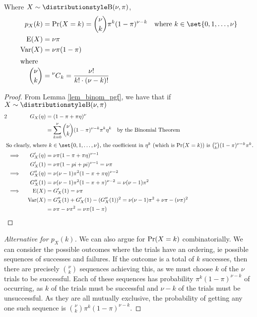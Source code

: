 \begin{theorem}
 Where \(X \sim \Binomial(\nu, \pi)\),
 \begin{align*}
  p_X(k) &= \Prob(X = k) = \binom \nu k \pi^k (1 - \pi)^{\nu - k}
      \quad \text{where \(k \in \set{0, 1, \dotsc, \nu}\)} \\
  \Expect(X) &= \nu \pi \\
  \Var(X) &= \nu \pi (1 - \pi) \\
  \intertext{where}
  \binom \nu k &= \nCr \nu k = \frac{\nu!}{k!\cdot (\nu - k)!}
 \end{align*}
\end{theorem}
\begin{proof}
 From Lemma \ref{lem_binom_pgf}, we have that if \(X \sim \Binomial(\nu, \pi)\)
 \begin{alignat*} 2
  && G_X(\eta) &= (1 - \pi + \pi \eta)^\nu \\
  &&           &= \sum_{k = 0}^\nu
                  \binom \nu k (1 - \pi)^{\nu - k} \pi^k \eta^k
                      \quad \text{by the Binomial Theorem} \\
  \intertext{
  So clearly, where \(k \in \set{0, 1, \dotsc, \nu}\), the coefficient in
  \(\eta^k\) (which is \(\Prob(X = k)\)) is
  \(\binom \nu k (1 - \pi)^{\nu - k} \pi^k\).}
  &\implies{}& G_X'(\eta) &= \nu \pi (1 - \pi + \pi \eta)^{\nu - 1} \\
  && G_X'(1) &= \nu \pi (1 - pi + pi)^{\nu - 1} = \nu \pi \\
  &\implies{}& G_X''(\eta)
      &= \nu(\nu - 1) \pi^2 (1 - \pi + \pi \eta)^{\nu - 2} \\
  && G_X''(1)
      &= \nu(\nu - 1)\pi^2(1 - \pi + \pi)^{\nu - 2} = \nu(\nu - 1)\pi^2 \\
  &\implies{}& \Expect(X) &= G_X'(1) = \nu \pi \\
  && \Var(X) &= G_X''(1) + G_X'(1) - (G_X''(1))^2
      = \nu(\nu - 1) \pi^2 + \nu \pi - (\nu \pi)^2 \\
  && &= \nu \pi - \nu \pi^2 = \nu \pi (1 - \pi) \qedhere
 \end{alignat*}
\end{proof}
\begin{proof}[Alternative for \(p_X(k)\)]
 We can also argue for \(\operatorname{Pr}(X = k)\) combinatorially. We can consider the
 possible outcomes where the trials have an ordering, ie possible sequences of
 successes and failures. If the outcome is a total of \(k\) successes, then
 there are precisely \(\binom \nu k\) sequences achieving this, as we must
 choose \(k\) of the \(\nu\) trials to be successful. Each of these sequences
 has probability \(\pi^k (1 - \pi)^{\nu - k}\) of occurring, as \(k\) of the
 trials must be successful and \(\nu - k\) of the trials must be unsuccessful.
 As they are all mutually exclusive, the probability of getting any one such
 sequence is \(\binom \nu k \pi^k (1 - \pi)^{\nu - k}\).
\end{proof}
